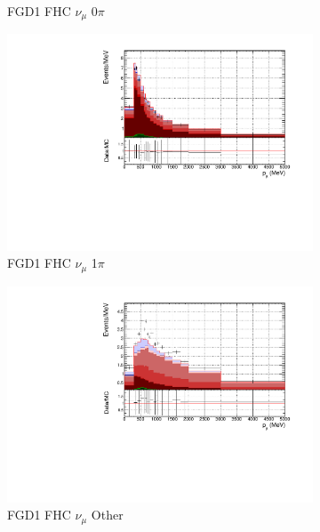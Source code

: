 \begin{figure}
\begin{subfigure}{.32\textwidth}
  \caption{FGD1 FHC $\nu_{\mu}$ 0$\pi$}
  \label{fig:pstack_FGD1_numuCC_0pi}
\end{subfigure}
\begin{subfigure}{.32\textwidth}
  \centering
  \includegraphics[width=0.95\linewidth]{figs/FGD1_numuCC_1pi_p}
  \caption{FGD1 FHC $\nu_{\mu}$ 1$\pi$}
  \label{fig:pstack_FGD1_numuCC_1pi}
\end{subfigure}
\begin{subfigure}{.32\textwidth}
  \centering
  \includegraphics[width=0.95\linewidth]{figs/FGD1_numuCC_other_p}
  \caption{FGD1 FHC $\nu_{\mu}$ Other}
  \label{fig:pstack_FGD1_numuCC_other}
\end{subfigure}
\centering
\begin{subfigure}{.32\textwidth}
  \centering

\end{subfigure}
\end{figure}
